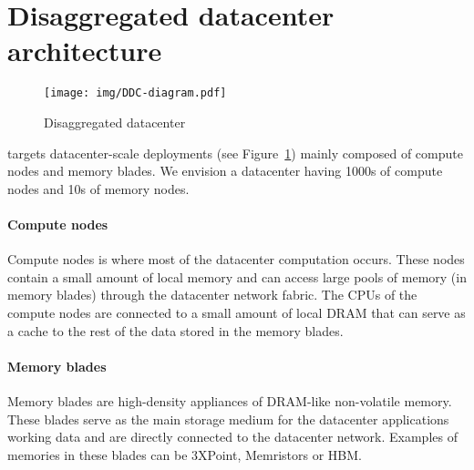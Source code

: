 \section{Disaggregated datacenter architecture}
\label{sec:ddc_architecture}

\begin{center}
\begin{figure}[!ht]
\texttt{[image: img/DDC-diagram.pdf]}
\caption{Disaggregated datacenter}
\label{fig:ddc}
\end{figure}
\end{center}


\System targets datacenter-scale deployments (see Figure~\ref{fig:ddc}) mainly composed of compute nodes and memory blades. We envision a datacenter having 1000s of compute nodes and 10s of memory nodes.





\paragraph{Compute nodes}
Compute nodes is where most of the datacenter computation occurs. These nodes contain a small amount of local memory and can access large pools of memory (in memory blades) through the datacenter network fabric. The CPUs of the compute nodes are connected to a small amount of local DRAM that can serve as a cache to the rest of the data stored in the memory blades.

\paragraph{Memory blades}
Memory blades are high-density appliances of DRAM-like non-volatile memory. These blades serve as the main storage medium for the datacenter applications working data and are directly connected to the datacenter network. Examples of memories in these blades can be 3XPoint, Memristors or HBM.



